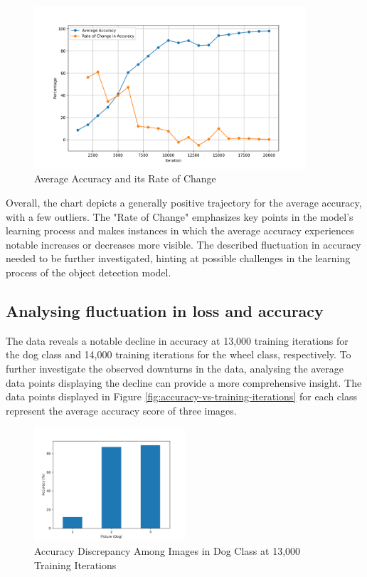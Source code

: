 \newpage

\begin{figure}[h]
   \centering
   \includegraphics[width=0.9\textwidth]{../Data/accuracy-improvement-graph.png}
   \caption{Average Accuracy and its Rate of Change}
   \label{fig:accuracy-improvement}
\end{figure}

Overall, the chart depicts a generally positive trajectory for the average accuracy, with a few outliers. The "Rate of Change" emphasizes
key points in the model's learning process and makes instances in which the average accuracy experiences notable increases or decreases more
visible. The described fluctuation in accuracy needed to be further investigated, hinting at possible
challenges in the learning process of the object detection model. \\

\subsection{Analysing fluctuation in loss and accuracy}

The data reveals a notable decline in accuracy at 13,000 training iterations for the dog class and 14,000 training iterations for the wheel class, respectively. To further investigate the observed downturns in the data, analysing the average data points displaying the decline can provide a more comprehensive insight. The data points displayed in Figure \ref{fig:accuracy-vs-training-iterations} for each class represent the average accuracy score of three images. 
\newpage
\begin{figure}[h]
   \centering
   \includegraphics[width=0.5\textwidth]{../Data/dog-outliers.png}
   \caption{Accuracy Discrepancy Among Images in Dog Class at 13,000 Training Iterations}
   \label{fig:14000-dog}
\end{figure}

